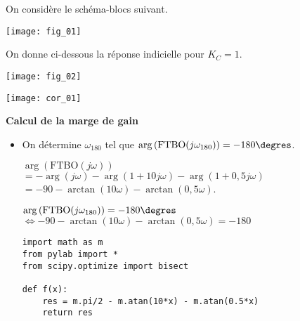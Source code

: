 




\ifprof
\else
\begin{multicols}{2}
\fi

\setcounter{numques}{0}
On considère le schéma-blocs suivant. 
\begin{center}
\texttt{[image: fig\_01]}
\end{center}

On donne ci-dessous la réponse indicielle pour $K_C=1$.

\begin{center}
\texttt{[image: fig\_02]}
\end{center}



\ifprof
\begin{center}
\texttt{[image: cor\_01]}
\end{center}

\else
\fi


\ifprof
\begin{corrige}
\textbf{Calcul de la marge de gain}
\begin{itemize}
\item On détermine $\omega_{180}$ tel que $\arg\left(\text{FTBO}(j\omega_{180})\right)=-180\degres$. 

$\arg\left(\text{FTBO}(j\omega)\right) $ $= -\arg\left( j\omega\right)-\arg\left( 1+ 10 j\omega\right)-\arg\left(1+0,5j\omega \right) $ $= - 90 - \arctan \left( 10 \omega \right) - \arctan \left( 0,5 \omega \right)$.

$\arg\left(\text{FTBO}(j\omega_{180})\right)=-180\degres$ 
$\Leftrightarrow - 90 - \arctan \left( 10 \omega \right) - \arctan \left( 0,5 \omega \right) = -180$

\begin{lstlisting}
import math as m
from pylab import *
from scipy.optimize import bisect 

def f(x):                                       
    res = m.pi/2 - m.atan(10*x) - m.atan(0.5*x)
    return res


\end{lstlisting}
\end{itemize}
\end{corrige}
\end{multicols}
